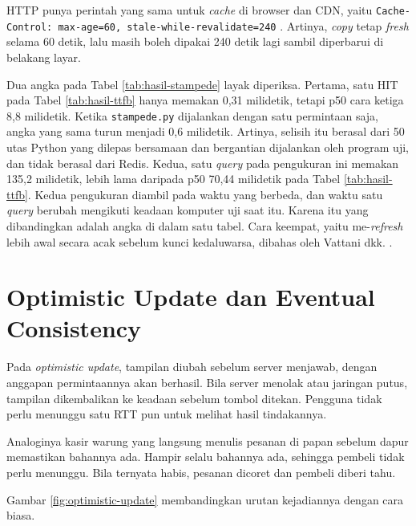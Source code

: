HTTP punya perintah yang sama untuk \textit{cache} di browser dan CDN, yaitu
\texttt{Cache-Control: max-age=60, stale-while-revalidate=240}
\cite{rfc5861}. Artinya, \textit{copy} tetap \textit{fresh} selama 60 detik, lalu masih boleh
dipakai 240 detik lagi sambil diperbarui di belakang layar.

Dua angka pada Tabel \ref{tab:hasil-stampede} layak diperiksa. Pertama, satu
HIT pada Tabel \ref{tab:hasil-ttfb} hanya memakan 0,31 milidetik, tetapi p50
cara ketiga 8,8 milidetik. Ketika \texttt{stampede.py} dijalankan dengan satu
permintaan saja, angka yang sama turun menjadi 0,6 milidetik. Artinya, selisih
itu berasal dari 50 utas Python yang dilepas bersamaan dan bergantian
dijalankan oleh program uji, dan tidak berasal dari Redis. Kedua, satu \textit{query}
pada pengukuran ini memakan 135,2 milidetik, lebih lama daripada p50 70,44
milidetik pada Tabel \ref{tab:hasil-ttfb}. Kedua pengukuran diambil pada waktu
yang berbeda, dan waktu satu \textit{query} berubah mengikuti keadaan komputer uji saat
itu. Karena itu yang dibandingkan adalah angka di dalam satu tabel. Cara
keempat, yaitu me-\textit{refresh} lebih awal secara acak sebelum kunci kedaluwarsa,
dibahas oleh Vattani dkk. \cite{vattani2015xfetch}.

\section{Optimistic Update dan Eventual Consistency}
\label{sec:optimistic}

Pada \textit{optimistic update}, tampilan diubah sebelum server menjawab,
dengan anggapan permintaannya akan berhasil. Bila server menolak atau jaringan
putus, tampilan dikembalikan ke keadaan sebelum tombol ditekan. Pengguna tidak
perlu menunggu satu RTT pun untuk melihat hasil tindakannya.

Analoginya kasir warung yang langsung menulis pesanan di papan sebelum dapur
memastikan bahannya ada. Hampir selalu bahannya ada, sehingga pembeli tidak
perlu menunggu. Bila ternyata habis, pesanan dicoret dan pembeli diberi tahu.

Gambar \ref{fig:optimistic-update} membandingkan urutan kejadiannya dengan cara
biasa.

